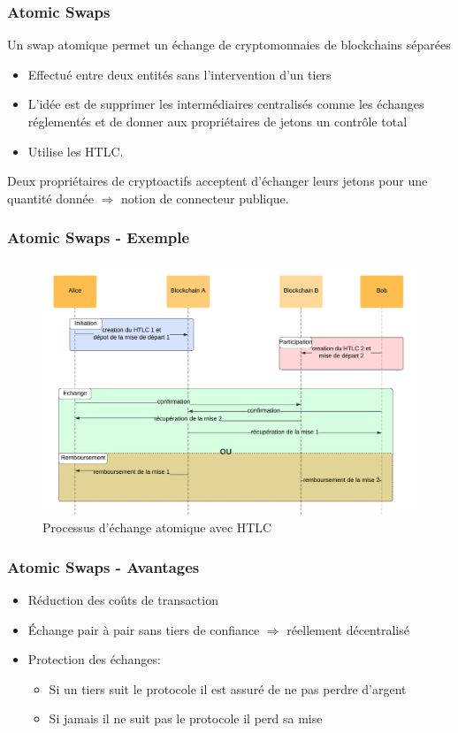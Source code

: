 \begin{frame}
	\frametitle{Atomic Swaps}
	Un swap atomique permet un échange de cryptomonnaies de blockchains séparées
	\begin{itemize}
		\item Effectué entre deux entités sans l’intervention d’un tiers
		\item L’idée est de supprimer les intermédiaires centralisés comme les échanges réglementés et de donner aux propriétaires de jetons un contrôle total
		\item Utilise les HTLC. \newline
	\end{itemize}
	Deux propriétaires de cryptoactifs acceptent d’échanger leurs jetons pour une quantité donnée
	$\Rightarrow$ notion de connecteur publique.
\end{frame}

\begin{frame}
	\frametitle{Atomic Swaps - Exemple}
	\begin{figure}
		\includegraphics[scale = 0.10]{decentralisation/atomicSwap.png}
		\caption{Processus d'échange atomique avec HTLC}
	\end{figure}

\end{frame}

\begin{frame}
	\frametitle{Atomic Swaps - Avantages}
	\subtitle{Avantages}
	\begin{itemize}
		\item Réduction des coûts de transaction
		\item Échange pair à pair sans tiers de confiance $\Rightarrow$ réellement décentralisé
		\item Protection des échanges:
		      \begin{itemize}
			      \item Si un tiers suit le protocole il est assuré de ne pas perdre d'argent
			      \item Si jamais il ne suit pas le protocole il perd sa mise
		      \end{itemize}
	\end{itemize}
\end{frame}


